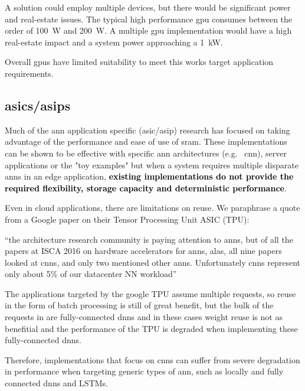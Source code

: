 A solution could employ multiple devices, but there would be significant power and real-estate issues. 
The typical high performance \ac{gpu} consumes between the order of \SI{100}{\watt} and \SI{200}{\watt}.
A multiple \ac{gpu} implementation would have a high real-estate impact and a system power approaching a \SI[per-mode=symbol]{1}{\kilo \watt}.

Overall \acp{gpu} have limited suitability to meet this works target application requirements.


\subsection{\Acp{asic}/\Acp{asip}}
\label{sec:asicAndAsip}
Much of the \ac{ann} application specific (\ac{asic}/\ac{asip}) research has focused on taking advantage of the performance and ease of use of \acf{sram}.
These implementations can be shown to be effective with specific \ac{ann} architectures (e.g. \ \ac{cnn}), server applications or the "toy examples" but when a system requires multiple disparate \ac{ann}s in an edge application, \textbf{\textcolor{black}{existing implementations do not provide the required flexibility, storage capacity and deterministic performance}}.

Even in cloud applications, there are limitations on reuse. We paraphrase a quote from a Google paper \cite{tensorflow2015-whitepaper} on their Tensor Processing Unit ASIC (TPU):

\hyphenquote{american}{the architecture research community is paying attention to \acp{ann}, but of all the papers at ISCA 2016 on hardware accelerators for \acp{ann}, alas, all nine papers looked at \ac{cnn}s, and only two mentioned other \acp{ann}. 
Unfortunately \ac{cnn}s represent only about 5\% of our datacenter NN workload}

The applications targeted by the google TPU \cite{tensorflow2015-whitepaper} assume multiple requests, so reuse in the form of batch processing is still of great benefit, but the bulk of the requests in \cite{tensorflow2015-whitepaper} are fully-connected \ac{dnn}s and in these cases weight reuse is not as benefitial and the performance of the TPU is degraded when implementing these fully-connected \ac{dnn}s.

Therefore, implementations that focus on \ac{cnn}s can suffer from severe degradation in performance when targeting generic types of \ac{ann}, such as locally and fully connected \ac{dnn}s and LSTMs.

